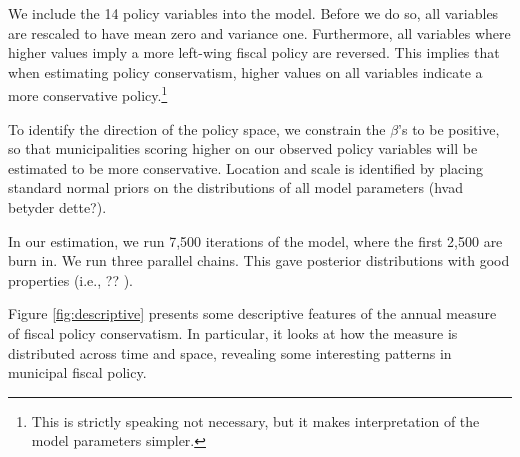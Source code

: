 \documentclass[a4paper,12pt]{article}
\begin{document}
We include the 14 policy variables into the model. Before we do so, all variables are rescaled to have mean zero and variance one. Furthermore, all variables where higher values imply a more left-wing fiscal policy are reversed. This implies that when estimating policy conservatism, higher values on all variables indicate a more conservative policy.\footnote{This is strictly speaking not necessary, but it makes interpretation of the model parameters simpler.}

To identify the direction of the policy space, we constrain the $\beta$'s to be positive, so that municipalities scoring higher on our observed policy variables will be estimated to be more conservative. Location and scale is identified by placing standard normal priors on the distributions of all model parameters (hvad betyder dette?).

In our estimation, we run 7,500 iterations of the model, where the first 2,500 are burn in. We run three parallel chains. This gave posterior distributions with good properties (i.e., ?? ).

Figure \ref{fig:descriptive} presents some descriptive features of the annual measure of fiscal policy conservatism. In particular, it looks at how the measure is distributed across time and space, revealing some interesting patterns in municipal fiscal policy.
\end{document}
